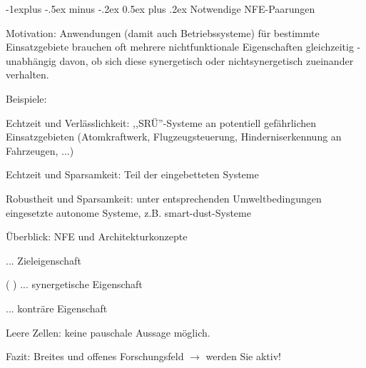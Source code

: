 \documentclass[a4paper]{article}
\makeatletter
\newcommand{\cmark}{\ding{51}}
\newcommand{\xmark}{\ding{55}}
\renewcommand{\subsection}{\@startsection{subsection}{2}{0mm}%
 {-1explus -.5ex minus -.2ex}%
 {0.5ex plus .2ex}%
 {\normalfont\normalsize\bfseries}}
\makeatother
\begin{document}
\begin{multicols}{3}
    \subsection{Notwendige NFE-Paarungen}

    \begin{itemize*}
        \item
        Motivation: Anwendungen (damit auch Betriebssysteme) für bestimmte
        Einsatzgebiete brauchen oft mehrere nichtfunktionale Eigenschaften
        gleichzeitig - unabhängig davon, ob sich diese synergetisch oder
        nichtsynergetisch zueinander verhalten.
        \item
        Beispiele:
        \begin{itemize*}
            \item Echtzeit und Verlässlichkeit: ,,SRÜ''-Systeme an potentiell gefährlichen Einsatzgebieten (Atomkraftwerk, Flugzeugsteuerung, Hinderniserkennung an Fahrzeugen, ...)
            \item Echtzeit und Sparsamkeit: Teil der eingebetteten Systeme
            \item Robustheit und Sparsamkeit: unter entsprechenden Umweltbedingungen eingesetzte autonome Systeme, z.B. smart-dust-Systeme
        \end{itemize*}
    \end{itemize*}

    Überblick: NFE und Architekturkonzepte


    \begin{itemize*}
        \item
        \cmark ... Zieleigenschaft
        \item
        ( \cmark ) ... synergetische Eigenschaft
        \item
        \xmark ... konträre Eigenschaft
        \item
        Leere Zellen: keine pauschale Aussage möglich.
    \end{itemize*}

    Fazit: Breites und offenes Forschungsfeld $\rightarrow$
    werden Sie aktiv!

\end{multicols}
\end{document}
